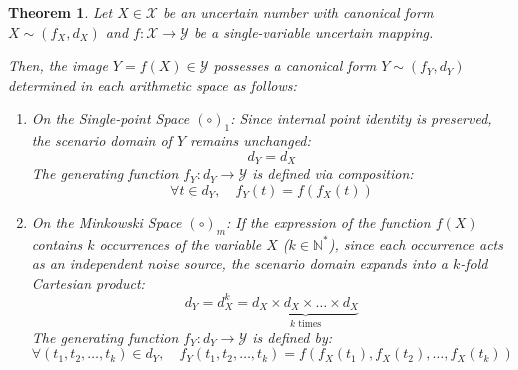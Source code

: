 \documentclass[a4paper,12pt, twoside]{memoir}
\newtheorem{theorem}{Theorem}[chapter]
\begin{document}
\begin{theorem}
	\label{dl:3.2}
	Let $X \in \mathcal{X}$ be an uncertain number with canonical form $X \sim (f_X, d_X)$ and $f: \mathcal{X} \rightarrow \mathcal{Y}$ be a single-variable uncertain mapping.

	Then, the image $Y = f(X) \in \mathcal{Y}$ possesses a canonical form $Y \sim (f_Y, d_Y)$ determined in each arithmetic space as follows:

	\begin{enumerate}[leftmargin=*]
		\item On the Single-point Space $(\circ)_1$:
		      Since internal point identity is preserved, the scenario domain of $Y$ remains unchanged:
		      \[
			      d_Y = d_X
		      \]
		      The generating function $f_Y: d_Y \rightarrow \mathcal{Y}$ is defined via composition:
		      \[
			      \forall t \in d_Y, \quad f_Y(t) = f(f_X(t))
		      \]

		\item On the Minkowski Space $(\circ)_m$:
		      If the expression of the function $f(X)$ contains $k$ occurrences of the variable $X$ ($k \in \mathbb{N}^*$), since each occurrence acts as an independent noise source, the scenario domain expands into a $k$-fold Cartesian product:
		      \[
			      d_Y = d_X^k = \underbrace{d_X \times d_X \times \dots \times d_X}_{k \text{ times}}
		      \]
		      The generating function $f_Y: d_Y \rightarrow \mathcal{Y}$ is defined by:
		      \[
			      \forall (t_1, t_2, \dots, t_k) \in d_Y, \quad f_Y(t_1, t_2, \dots, t_k) = f\left(f_X(t_1), f_X(t_2), \dots, f_X(t_k)\right)
		      \]
	\end{enumerate}
\end{theorem}
\end{document}

